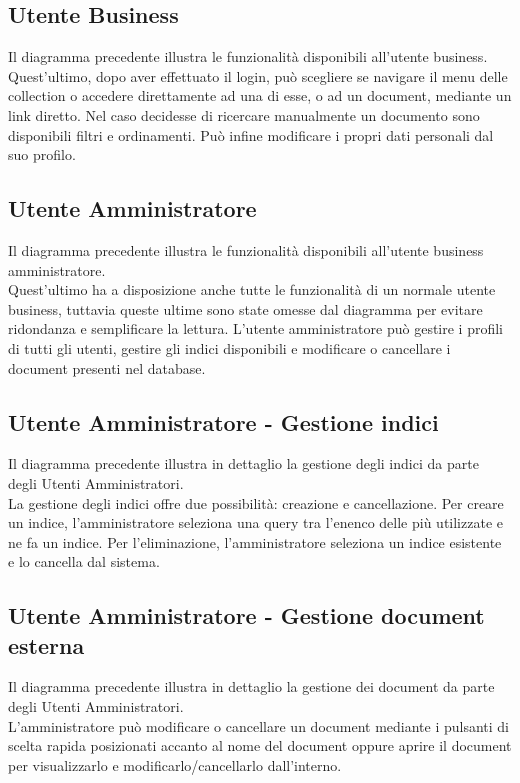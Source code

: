 
\subsection{Utente Business}
Il diagramma precedente illustra le funzionalità disponibili all'utente business.\\
Quest'ultimo, dopo aver effettuato il login, può scegliere se navigare il menu delle collection o accedere direttamente ad una di esse, o ad un document, mediante un link diretto.
Nel caso decidesse di ricercare manualmente un documento sono disponibili filtri e ordinamenti.
Può infine modificare i propri dati personali dal suo profilo.

\subsection{Utente Amministratore}
Il diagramma precedente illustra le funzionalità disponibili all'utente business amministratore.\\
Quest'ultimo ha a disposizione anche tutte le funzionalità di un normale utente business, tuttavia queste ultime sono state omesse dal diagramma per evitare ridondanza e semplificare la lettura.
L'utente amministratore può gestire i profili di tutti gli utenti, gestire gli indici disponibili e modificare o cancellare i document presenti nel database.

\subsection{Utente Amministratore - Gestione indici}
Il diagramma precedente illustra in dettaglio la gestione degli indici da parte degli Utenti Amministratori.\\
La gestione degli indici offre due possibilità: creazione e cancellazione.
Per creare un indice, l'amministratore seleziona una query tra l'enenco delle più utilizzate e ne fa un indice.
Per l'eliminazione, l'amministratore seleziona un indice esistente e lo cancella dal sistema.

\subsection{Utente Amministratore - Gestione document esterna}
Il diagramma precedente illustra in dettaglio la gestione dei document da parte degli Utenti Amministratori.\\
L'amministratore può modificare o cancellare un document mediante i pulsanti di scelta rapida posizionati accanto al nome del document oppure aprire il document per visualizzarlo e modificarlo/cancellarlo dall'interno.


